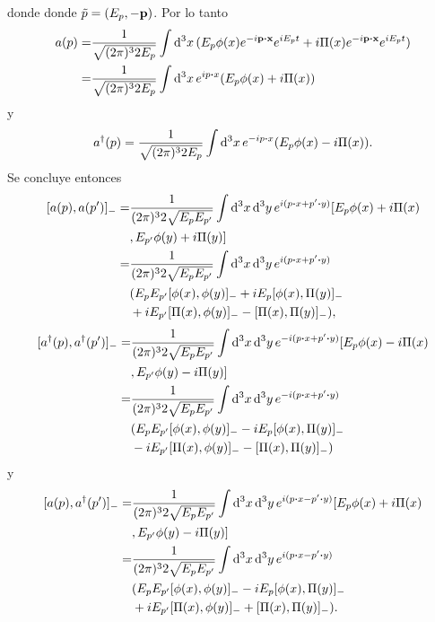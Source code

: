 \documentclass{article}
\begin{document}
donde donde $\tilde{p}=(E_p,-\vb{p})$. Por lo tanto
\begin{align}
\begin{split}
a(p)=&\frac{1}{\sqrt{(2\pi)^32E_p}}\int \dd[3]{x}(E_p\phi(x)e^{-i\vb{p}\vdot\vb{x}}e^{iE_pt}+i\Pi(x)e^{-i\vb{p}\vdot\vb{x}}e^{iE_pt})\\
=&\frac{1}{\sqrt{(2\pi)^32E_p}}\int \dd[3]{x}e^{ip\vdot x}(E_p\phi(x)+i\Pi(x))
\end{split}
\end{align}
y
\begin{equation}
a^\dagger(p)=\frac{1}{\sqrt{(2\pi)^32E_p}}\int \dd[3]{x}e^{-ip\vdot x}(E_p\phi(x)-i\Pi(x)).
\end{equation}
Se concluye entonces
\begin{align}
\begin{split}
[a(p),a(p')]_-=&\frac{1}{(2\pi)^32\sqrt{E_pE_{p'}}}\int \dd[3]{x}\dd[3]{y}e^{i(p\vdot x+p'\vdot y)}[E_p\phi(x)+i\Pi(x)\\
&,E_{p'}\phi(y)+i\Pi(y)]\\
=&\frac{1}{(2\pi)^32\sqrt{E_pE_{p'}}}\int \dd[3]{x}\dd[3]{y}e^{i(p\vdot x+p'\vdot y)}\\
&(E_pE_{p'}[\phi(x),\phi(y)]_-+iE_p[\phi(x),\Pi(y)]_-\\
&+iE_{p'}[\Pi(x),\phi(y)]_--[\Pi(x),\Pi(y)]_-),
\end{split}
\end{align}
\begin{align}
\begin{split}
[a^\dagger(p),a^\dagger(p')]_-=&\frac{1}{(2\pi)^32\sqrt{E_pE_{p'}}}\int \dd[3]{x}\dd[3]{y}e^{-i(p\vdot x+p'\vdot y)}[E_p\phi(x)-i\Pi(x)\\
&,E_{p'}\phi(y)-i\Pi(y)]\\
=&\frac{1}{(2\pi)^32\sqrt{E_pE_{p'}}}\int \dd[3]{x}\dd[3]{y}e^{-i(p\vdot x+p'\vdot y)}\\
&(E_pE_{p'}[\phi(x),\phi(y)]_--iE_p[\phi(x),\Pi(y)]_-\\
&-iE_{p'}[\Pi(x),\phi(y)]_--[\Pi(x),\Pi(y)]_-)
\end{split}
\end{align}
y
\begin{align}
\begin{split}
[a(p),a^\dagger(p')]_-=&\frac{1}{(2\pi)^32\sqrt{E_pE_{p'}}}\int \dd[3]{x}\dd[3]{y}e^{i(p\vdot x-p'\vdot y)}[E_p\phi(x)+i\Pi(x)\\
&,E_{p'}\phi(y)-i\Pi(y)]\\
=&\frac{1}{(2\pi)^32\sqrt{E_pE_{p'}}}\int \dd[3]{x}\dd[3]{y}e^{i(p\vdot x-p'\vdot y)}\\
&(E_pE_{p'}[\phi(x),\phi(y)]_--iE_p[\phi(x),\Pi(y)]_-\\
&+iE_{p'}[\Pi(x),\phi(y)]_-+[\Pi(x),\Pi(y)]_-).
\end{split}
\end{align}
\end{document}
